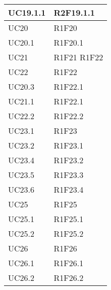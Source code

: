 \begin{center}
\begin{longtable}{|p{44mm}|p{22mm}|}
\hline
UC19.1.1 &
R2F19.1.1 \newline
\\
\hline
UC20 &
R1F20 \newline
\\
\hline
UC20.1 &
R1F20.1 \newline
\\
\hline
UC21 &
R1F21 \newline
R1F22 \newline
\\
\hline
UC22 &
R1F22 \newline
\\
\hline
UC20.3 &
R1F22.1 \newline
\\
\hline
UC21.1 &
R1F22.1 \newline
\\
\hline
UC22.2 &
R1F22.2 \newline
\\
\hline
UC23.1 &
R1F23 \newline
\\
\hline
UC23.2 &
R1F23.1 \newline
\\
\hline
UC23.4 &
R1F23.2 \newline
\\
\hline
UC23.5 &
R1F23.3 \newline
\\
\hline
UC23.6 &
R1F23.4 \newline
\\
\hline
UC25 &
R1F25 \newline
\\
\hline
UC25.1 &
R1F25.1 \newline
\\
\hline
UC25.2 &
R1F25.2 \newline
\\
\hline
UC26 &
R1F26 \newline
\\
\hline
UC26.1 &
R1F26.1 \newline
\\
\hline
UC26.2 &
R1F26.2 \newline
\\
\hline

	\end{longtable}
\end{center}

